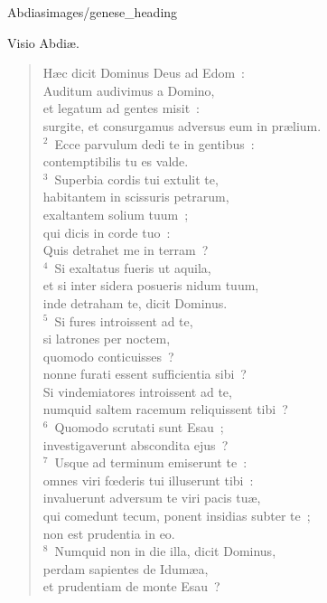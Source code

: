 {Abdias}{images/genese_heading}

\noindent Visio Abdi\ae . \begin{flushleft}\begin{verse}\vspace{6pt}H\ae c dicit Dominus Deus ad Edom~:\\ Auditum audivimus a Domino,\\ et legatum ad gentes misit~:\\ surgite, et consurgamus adversus eum in pr\ae lium.\\
${}^{2}$~Ecce parvulum dedi te in gentibus~:\\ contemptibilis tu es valde.\\
${}^{3}$~Superbia cordis tui extulit te,\\ habitantem in scissuris petrarum,\\ exaltantem solium tuum~;\\ qui dicis in corde tuo~:\\ Quis detrahet me in terram~?\\
${}^{4}$~Si exaltatus fueris ut aquila,\\ et si inter sidera posueris nidum tuum,\\ inde detraham te, dicit Dominus.\\
${}^{5}$~Si fures introissent ad te,\\ si latrones per noctem,\\ quomodo conticuisses~?\\ nonne furati essent sufficientia sibi~?\\ Si vindemiatores introissent ad te,\\ numquid saltem racemum reliquissent tibi~?\\
${}^{6}$~Quomodo scrutati sunt Esau~;\\ investigaverunt abscondita ejus~?\\
${}^{7}$~Usque ad terminum emiserunt te~:\\ omnes viri fœderis tui illuserunt tibi~:\\ invaluerunt adversum te viri pacis tu\ae ,\\ qui comedunt tecum, ponent insidias subter te~;\\ non est prudentia in eo.\\
${}^{8}$~Numquid non in die illa, dicit Dominus,\\ perdam sapientes de Idum\ae a,\\ et prudentiam de monte Esau~?\\

\end{verse}
\end{flushleft}
